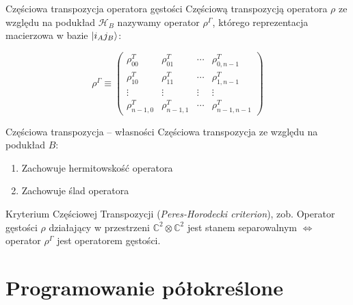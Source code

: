 \documentclass{beamer}
\begin{document}
\begin{frame}
    \begin{exampleblock}{Częściowa transpozycja operatora gęstości}
        Częściową transpozycją operatora $\rho$ ze względu na podukład $\mathcal{H}_{B}$ nazywamy operator $\rho ^ {\Gamma}$, którego reprezentacja macierzowa w bazie $\ket{i_{A} j_{B}}$:

        $$
            \rho ^ {\Gamma} \equiv
            \begin{pmatrix}
                \rho_{00} ^ {T} & \rho_{01} ^ {T} & \cdots & \rho_{0, n - 1} ^ {T} \\
                \rho_{10} ^ {T} & \rho_{11} ^ {T} & \cdots & \rho_{1, n - 1} ^ {T} \\
                \vdots & \vdots & \vdots & \vdots \\
                \rho_{n - 1, 0} ^ {T} & \rho_{n - 1, 1} ^ {T} & \cdots & \rho_{n - 1, n - 1} ^ {T}
            \end{pmatrix}
        $$
    \end{exampleblock}
\end{frame}

\begin{frame}
    \begin{alertblock}{Częściowa transpozycja -- własności}
        Częściowa transpozycja ze względu na podukład $B$:

        \begin{enumerate}
            \item Zachowuje hermitowskość operatora
            \item Zachowuje ślad operatora
        \end{enumerate}
    \end{alertblock}
\end{frame}

\begin{frame}
    \begin{alertblock}{Kryterium Częściowej Transpozycji (\textit{Peres-Horodecki criterion}), zob. \cite{hor2009}}
        Operator gęstości $\rho$ działający w przestrzeni $\mathbb{C} ^ {2} \otimes \mathbb{C} ^ {2}$ jest stanem separowalnym $\Leftrightarrow$ operator $\rho ^ {\Gamma}$ jest operatorem gęstości.
    \end{alertblock}
\end{frame}

\section{Programowanie półokreślone}
\end{document}
